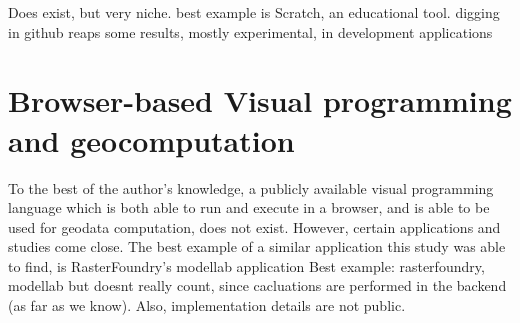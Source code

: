 
Does exist, but very niche. 
best example is Scratch, an educational tool.
digging in github reaps some results, mostly experimental, in development applications

\section{Browser-based Visual programming and geocomputation} 

To the best of the author's knowledge, a publicly available visual programming language which is both able to run and execute in a browser, and is able to be used for geodata computation, does not exist. 
However, certain applications and studies come close. 
The best example of a similar application this study was able to find, is RasterFoundry's modellab application
Best example: rasterfoundry, modellab but doesnt really count, since cacluations are performed in the backend (as far as we know). 
Also, implementation details are not public. 


